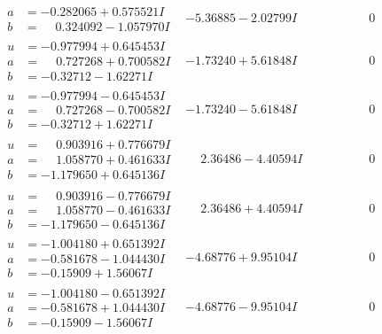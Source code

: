 \documentclass[1p]{elsarticle_modified}
\theoremstyle{definition}
\begin{document}
$$\begin{array}{c|c|c}
\begin{aligned}
a &= -0.282065 + 0.575521 I \\
b &= \phantom{-}0.324092 - 1.057970 I\end{aligned}
 & -5.36885 - 2.02799 I & \phantom{-0.000000 } 0 \\ \hline\begin{aligned}
u &= -0.977994 + 0.645453 I \\
a &= \phantom{-}0.727268 + 0.700582 I \\
b &= -0.32712 - 1.62271 I\end{aligned}
 & -1.73240 + 5.61848 I & \phantom{-0.000000 } 0 \\ \hline\begin{aligned}
u &= -0.977994 - 0.645453 I \\
a &= \phantom{-}0.727268 - 0.700582 I \\
b &= -0.32712 + 1.62271 I\end{aligned}
 & -1.73240 - 5.61848 I & \phantom{-0.000000 } 0 \\ \hline\begin{aligned}
u &= \phantom{-}0.903916 + 0.776679 I \\
a &= \phantom{-}1.058770 + 0.461633 I \\
b &= -1.179650 + 0.645136 I\end{aligned}
 & \phantom{-}2.36486 - 4.40594 I & \phantom{-0.000000 } 0 \\ \hline\begin{aligned}
u &= \phantom{-}0.903916 - 0.776679 I \\
a &= \phantom{-}1.058770 - 0.461633 I \\
b &= -1.179650 - 0.645136 I\end{aligned}
 & \phantom{-}2.36486 + 4.40594 I & \phantom{-0.000000 } 0 \\ \hline\begin{aligned}
u &= -1.004180 + 0.651392 I \\
a &= -0.581678 - 1.044430 I \\
b &= -0.15909 + 1.56067 I\end{aligned}
 & -4.68776 + 9.95104 I & \phantom{-0.000000 } 0 \\ \hline\begin{aligned}
u &= -1.004180 - 0.651392 I \\
a &= -0.581678 + 1.044430 I \\
b &= -0.15909 - 1.56067 I\end{aligned}
 & -4.68776 - 9.95104 I & \phantom{-0.000000 } 0 \\ \hline\begin{aligned}

\end{aligned}
\end{array}$$
\end{document}

